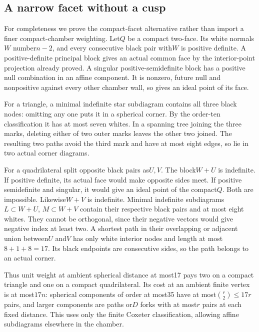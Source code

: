 \documentclass[11pt]{article}
\theoremstyle{remark}\newtheorem{remark}[theorem]{Remark}
\begin{document}
\subsection{A narrow facet without a cusp}

For completeness we prove the compact-facet alternative rather
than import a finer compact-chamber weighting. Let$Q$ be a compact
two-face. Its white normals$W$ number$n-2$, and every consecutive
black pair with$W$ is positive definite. A positive-definite
principal block gives an actual common face by the interior-point
projection already proved. A singular positive-semidefinite block
has a positive null combination in an affine component. It is
nonzero, future null and nonpositive against every other chamber
wall, so gives an ideal point of its face.

For a triangle, a minimal indefinite star subdiagram contains all
three black nodes: omitting any one puts it in a spherical corner.
By the order-ten classification it has at most seven whites.
In a spanning tree joining the three marks, deleting either of
two outer marks leaves the other two joined. The resulting two
paths avoid the third mark and have at most eight edges, so lie
in two actual corner diagrams.

For a quadrilateral split opposite black pairs as$U,V$.
The block$W+U$ is indefinite. If positive definite, its actual
face would make opposite sides meet. If positive semidefinite
and singular, it would give an ideal point of the compact$Q$.
Both are impossible. Likewise$W+V$ is indefinite.
Minimal indefinite subdiagrams$L\subset W+U$, $M\subset W+V$
contain their respective black pairs and at most eight whites.
They cannot be orthogonal, since their negative vectors would
give negative index at least two. A shortest path in their
overlapping or adjacent union between$U$ and$V$ has only white
interior nodes and length at most$8+1+8=17$. Its black endpoints
are consecutive sides, so the path belongs to an actual corner.

Thus unit weight at ambient spherical distance at most17 pays
two on a compact triangle and one on a compact quadrilateral.
Its cost at an ambient finite vertex is at most$17n$: spherical
components of order at most35 have at most$\binom r2\le17r$
pairs, and larger components are paths or$D$ forks with at most$r$
pairs at each fixed distance. This uses only the finite Coxeter
classification, allowing affine subdiagrams elsewhere in the chamber.
\end{document}
